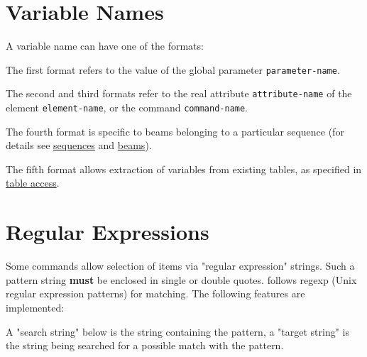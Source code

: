 
%
\section{Variable Names}
\label{sec:variable}
A variable name can have one of the formats: 

The first format refers to the value of the global parameter
\texttt{parameter-name}.

The second and third formats refer to the real attribute
\texttt{attribute-name} of the element  \texttt{element-name}, or the
command \texttt{command-name}.  

The fourth format is specific
to beams belonging to a particular sequence (for details see
\hyperref[chap:sequence]{sequences} and \hyperref[chap:beam]{beams}). 

The fifth format allows extraction of variables from existing tables, as specified in
\hyperref[chap:tables]{table access}.  



%
\section{Regular Expressions}
\label{sec:regex}
Some commands allow selection of items via "regular expression"
strings. Such a pattern string \textbf{must} be enclosed in single or
double quotes. \madx follows regexp (Unix regular expression patterns)
for matching. The following features are implemented:  

A "search string" below is the string containing the pattern, a "target
string" is the string being searched for a possible match with the
pattern. 

